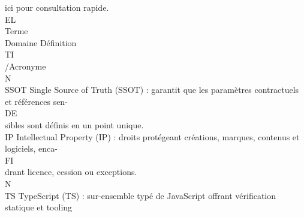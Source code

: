 \documentclass[12pt,landscape,a4paper]{article}
\begin{document}
\vspace{0.5em}
ici pour consultation rapide.\\
\vspace{0.5em}
\vspace{0.5em}
\vspace{0.5em}
\vspace{0.5em}
EL\\
Terme\\
Domaine                            Définition\\
\vspace{0.5em}
\vspace{0.5em}
\vspace{0.5em}
\vspace{0.5em}
TI\\
/Acronyme\\
\vspace{0.5em}
\vspace{0.5em}
\vspace{0.5em}
\vspace{0.5em}
N\\
SSOT                                                                         Single Source of Truth (SSOT) : garantit que les paramètres contractuels et références sen-\\
\vspace{0.5em}
\vspace{0.5em}
\vspace{0.5em}
\vspace{0.5em}
DE\\
sibles sont définis en un point unique.\\
\vspace{0.5em}
IP                                                                           Intellectual Property (IP) : droits protégeant créations, marques, contenus et logiciels, enca-\\
\vspace{0.5em}
\vspace{0.5em}
\vspace{0.5em}
\vspace{0.5em}
FI\\
drant licence, cession ou exceptions.\\
\vspace{0.5em}
\vspace{0.5em}
\vspace{0.5em}
N\\
TS                                                                           TypeScript (TS) : sur-ensemble typé de JavaScript offrant vérification statique et tooling\\
\end{document}
